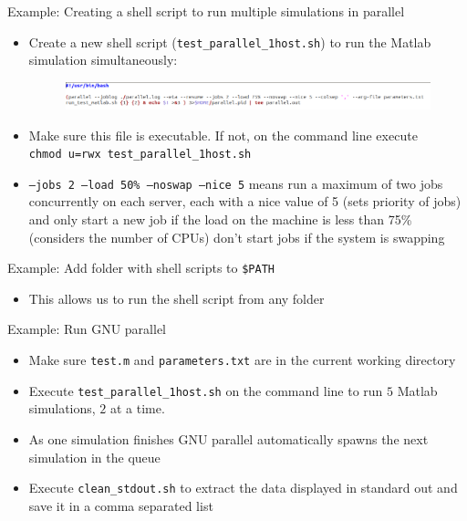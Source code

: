 \documentclass{beamer}
\begin{document}
\begin{frame}{Example: Creating a shell script to run multiple simulations in parallel}
\begin{itemize}
	\item Create a new shell script (\texttt{test\_parallel\_1host.sh}) to run the Matlab simulation simultaneously:
	\begin{figure}
		\includegraphics[width=\linewidth]{figures/run_parallel.png}
	\end{figure}
\item Make sure this file is executable. If not, on the command line execute \\ \texttt{chmod u=rwx test\_parallel\_1host.sh}
\item \texttt{--jobs 2 --load 50\% --noswap --nice 5} means
run a maximum of two jobs concurrently on each server, each with a nice value of 5 (sets priority of jobs) and only start a new job if the load on the machine is less than 75\% (considers the number of CPUs)
don't start jobs if the system is swapping
\end{itemize}
\end{frame}

\begin{frame}{Example: Add folder with shell scripts to \texttt{\$PATH}}
\begin{itemize}
	\item This allows us to run the shell script from any folder 
\end{itemize}
\end{frame}

\begin{frame}{Example: Run GNU parallel}
\begin{itemize}
	\item Make sure \texttt{test.m} and \texttt{parameters.txt} are in the current working directory
	\item Execute \texttt{test\_parallel\_1host.sh} on the command line to run $5$ Matlab simulations, $2$ at a time.
	\item As one simulation finishes GNU parallel automatically spawns the next simulation in the queue
	\item Execute \texttt{clean\_stdout.sh} to extract the data displayed in standard out and save it in a comma separated list
\end{itemize}
\end{frame}

\end{document}

